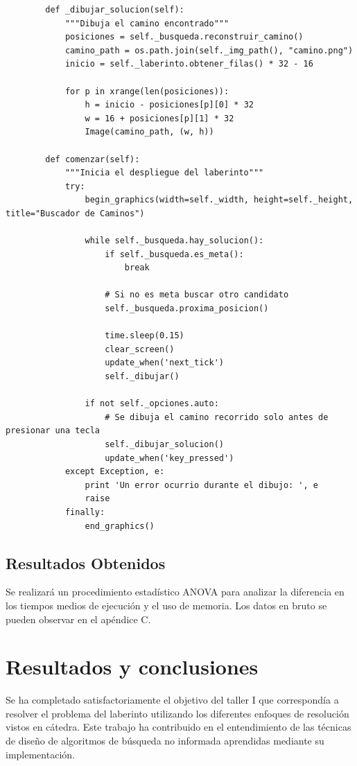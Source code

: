 \documentclass[letter, titlepage, 10pt]{article}
\begin{document}
\begin{lstlisting}
        def _dibujar_solucion(self):
            """Dibuja el camino encontrado"""
            posiciones = self._busqueda.reconstruir_camino()
            camino_path = os.path.join(self._img_path(), "camino.png")
            inicio = self._laberinto.obtener_filas() * 32 - 16
            
            for p in xrange(len(posiciones)):
                h = inicio - posiciones[p][0] * 32
                w = 16 + posiciones[p][1] * 32
                Image(camino_path, (w, h))
        
        def comenzar(self):
            """Inicia el despliegue del laberinto"""
            try:
                begin_graphics(width=self._width, height=self._height, title="Buscador de Caminos")
        
                while self._busqueda.hay_solucion():
                    if self._busqueda.es_meta():
                        break
                    
                    # Si no es meta buscar otro candidato
                    self._busqueda.proxima_posicion()
                    
                    time.sleep(0.15)
                    clear_screen()
                    update_when('next_tick')
                    self._dibujar()
                
                if not self._opciones.auto:
                    # Se dibuja el camino recorrido solo antes de presionar una tecla
                    self._dibujar_solucion()
                    update_when('key_pressed')
            except Exception, e:
                print 'Un error ocurrio durante el dibujo: ', e
                raise
            finally:
                end_graphics()
\end{lstlisting}

\subsection{Resultados Obtenidos}
Se realizará un procedimiento estadístico ANOVA para analizar la diferencia en los tiempos medios de ejecución y el uso de memoria. Los datos en bruto se pueden observar en el apéndice C.

\newpage
\section{Resultados y conclusiones}
Se ha completado satisfactoriamente el objetivo del taller I que correspondía a resolver el problema del laberinto utilizando los diferentes enfoques de resolución vistos en cátedra. Este trabajo ha contribuido en el entendimiento de las técnicas de diseño de algoritmos de búsqueda no informada aprendidas mediante su implementación.
\end{document}

